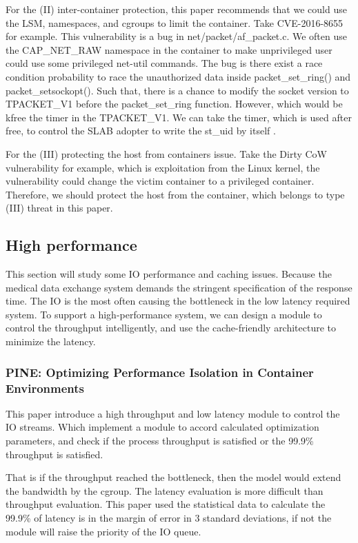 \documentclass[12pt,a4paper]{IEEEconf}
\begin{document}
For the (\RN{2}) inter-container protection, this paper recommends that we could use the
LSM, namespaces, and cgroups to limit the container. Take CVE-2016-8655\cite{CVE-2016-8655}
for example. This vulnerability is a bug in net/packet/af\_packet.c. We often use the
CAP\_NET\_RAW namespace in the container to make unprivileged user could use some privileged
net-util commands. The bug is there exist a race condition probability to race the unauthorized
data inside packet\_set\_ring() and packet\_setsockopt()\cite{CVE-2016-8655-lwn}. Such that,
there is a chance to modify the socket version to TPACKET\_V1 before the packet\_set\_ring
function. However, which would be kfree the timer in the TPACKET\_V1. We can take the timer,
which is used after free, to control the SLAB adopter to write the st\_uid by itself
\cite{AF_PACKET}.

For the (\RN{3}) protecting the host from containers issue.
Take the Dirty CoW vulnerability for example, which is exploitation from the Linux kernel,
the vulnerability could change the victim container to a privileged container. Therefore, we should
protect the host from the container, which belongs to type (\RN{3}) threat in this paper.

\subsection{High performance}
\hypertarget{heigh_performance}{}
This section will study some IO performance and caching issues. Because the medical
data exchange system demands the stringent specification of the response time.
The IO is the most often causing the bottleneck in the low latency required system.
To support a high-performance system, we can design a module to control the throughput
intelligently, and use the cache-friendly architecture to minimize the latency.

\subsubsection{PINE: Optimizing Performance Isolation in Container Environments}
This paper\cite{Optimizing} introduce a high throughput and low latency module to control
the IO streams. Which implement a module to accord calculated optimization parameters,
and check if the process throughput is satisfied or the 99.9\% throughput is satisfied.

That is if the throughput reached the bottleneck, then the model would extend the
bandwidth by the cgroup. The latency evaluation is more difficult than throughput
evaluation. This paper\cite{Optimizing} used the statistical data to calculate the
99.9\% of latency is in the margin of error in 3 standard deviations, if not the
module will raise the priority of the IO queue.
\end{document}
